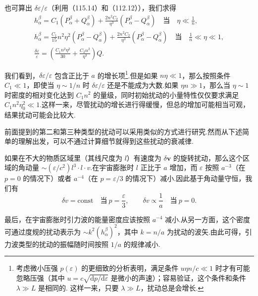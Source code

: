 也可算出 $\delta\varepsilon/\varepsilon$（利用（115.14）和（112.12）），我们求得
\begin{equation}
  \begin{gathered}
    h_{\alpha}^{\beta}
    =C_{1}(P_{\alpha}^{\beta}+Q_{\alpha}^{\beta})
    +\frac{2n^{2}C_{2}}{\eta^{3}}
    (P_{\alpha}^{\beta}-Q_{\alpha}^{\beta})
    \quad\text{当}\quad\eta\ll\frac{1}{n},\\
    h_{\alpha}^{\beta}
    =\frac{C_{1}}{15}n^{2}\eta^{2}(P_{\alpha}^{\beta}-Q_{\alpha}^{\beta})
    +\frac{2n^{2}C_{2}}{\eta^{3}}
    (P_{\alpha}^{\beta}-Q_{\alpha}^{\beta})
    \quad\text{当}\quad\frac{1}{n}\ll\eta\ll1,\\
    \frac{\delta\varepsilon}{\varepsilon}
    =\left(\frac{C_{1}n^{2}\eta^{2}}{30}
    +\frac{C_{2}n^{2}}{\eta^{3}}\right)Q.
  \end{gathered}
\end{equation}

我们看到，$\delta\varepsilon/\varepsilon$ 包含正比于 $a$ 的增长项\footnote{考虑微小压强 $p(\varepsilon)$ 的更细致的分析表明，满足条件 $u\eta n/c\ll1$ 时才有可能忽略压强（其中 $u=c\sqrt{\mathrm{d}p/\mathrm{d}\varepsilon}$ 是微小的声速）；容易验证，这个条件和条件 $\lambda\gg L$ 是相同的. 这样一来，只要 $\lambda\gg L$，扰动总是会增长.}.但是如果 $n\eta\ll1$，那么按照条件 $C_{1}\ll1$，即使当 $\eta\sim1/n$ 时 $\delta\varepsilon/\varepsilon$ 还是不能成为大数.如果 $\eta n\gg1$，那么当 $\eta\sim1$ 时密度的相对变化达到 $C_{1}n^{2}$ 的量级，同时初始扰动的小量特性仅仅要求满足 $C_{1}n^{2}\eta_{0}^{2}\ll1$.这样一来，尽管扰动的增长进行得缓慢，但总的增加可能相当可观，结果扰动可能会比较大.

前面提到的第二和第三种类型的扰动可以采用类似的方式进行研究.然而从下述简单的理解出发，可以不通过计算细节就得到这些扰动的衰减律.

如果在不大的物质区域里（其线尺度为 $l$）有速度为 $\delta\boldsymbol{v}$ 的旋转扰动，那么这个区域的角动量 $\sim(\varepsilon/c^{2})l^{3}\cdot l\cdot v$.在宇宙膨胀时 $l$ 正比于 $a$ 增加，而 $\varepsilon$ 按照 $a^{-3}$（在 $p=0$ 的情况下）或者 $a^{-4}$（在 $p=\varepsilon/3$ 的情况下）减小.因此基于角动量守恒，我们有
\begin{equation}
  \delta v=\mathrm{const}\quad\text{当}\ p=\frac{\varepsilon}{3},
  \qquad
  \delta v\propto\frac{1}{a}\quad\text{当}\ p=0.
\end{equation}

最后，在宇宙膨胀时引力波的能量密度应该按照 $a^{-4}$ 减小.从另一方面，这个密度可通过度规的扰动表示为 $\sim k^{2}(h_{\alpha}^{\beta})^{2}$，其中 $k=n/a$ 为扰动的波矢.由此可得，引力波类型的扰动的振幅随时间按照 $1/a$ 的规律减小.

